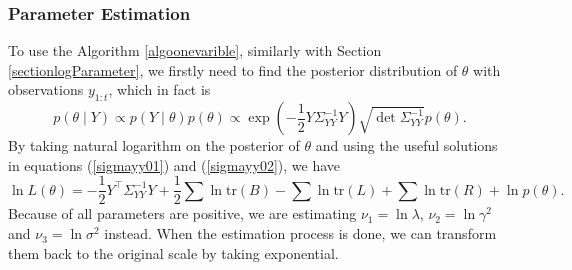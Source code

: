 \subsubsection*{Parameter Estimation}

To use the Algorithm \ref{algoonevarible}, similarly with Section \ref{sectionlogParameter}, we firstly need to find the posterior distribution of $\theta$ with observations $y_{1:t}$, which in fact is 
\begin{equation*}
p(\theta \mid Y) \propto p(Y\mid\theta)p(\theta) \propto \exp\left( -\frac{1}{2} Y \Sigma_{YY}^{-1} Y \right) \sqrt{\det \Sigma_{YY}^{-1}} p(\theta).
\end{equation*}
By taking natural logarithm on the posterior of $\theta$ and using the useful solutions in equations (\ref{sigmayy01}) and (\ref{sigmayy02}), we have 
\begin{equation}\label{simuOUlogL}
\ln L(\theta) = -\frac{1}{2}Y^\top\Sigma_{YY}^{-1}Y+\frac{1}{2}\sum\ln\mbox{tr}(B)-\sum\ln\mbox{tr}(L)+\sum\ln\mbox{tr}(R) + \ln p(\theta).
\end{equation}
Because of all parameters are positive, we are estimating $\nu_1=\ln\lambda$, $\nu_2=\ln\gamma^2$ and $\nu_3=\ln\sigma^2$ instead. When the estimation process is done, we can transform them back to the original scale by taking exponential. 


